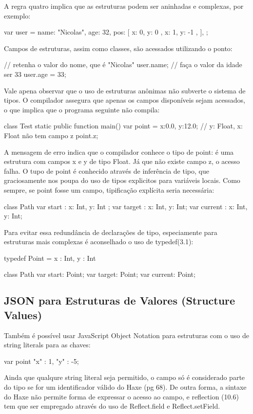 {{{A regra quatro implica que as estruturas podem ser aninhadas  e complexas, por exemplo:

var user = {
   name: "Nicolas",
   age: 32,
   pos: [
    { x: 0, y: 0 },
    { x: 1, y: -1 },
 ],
};

Campos de estruturas, assim como classes, são acessados utilizando o ponto:

// retenha o valor do nome, que é "Nicolas"
user.name;
// faça o valor da idade ser 33
user.age = 33;

Vale apena observar que o uso de estruturas anônimas não subverte o sistema de tipos. O compilador assegura que apenas os campos disponíveis sejam acessados, o que implica que o programa seguinte não compila:

class Test {
   static public function main() {
     var point = { x:0.0, y:12.0};
     // { y: Float, x: Float} não tem campo z
     point.z;
   }   
}

A mensagem de erro indica que o compilador conhece o tipo de point: é uma estrutura com campos x e y de tipo Float. Já que não existe campo z, o acesso falha. O tupo de point é conhecido através de inferência de tipo, que graciosamente nos poupa do uso de tipos explicitos para variáveis locais. Como sempre, se point fosse um campo, tipificação explícita seria necessária:

class Path {
   var start : {x: Int, y: Int };
   var target : {x: Int, y: Int};
   var current : { x: Int, y: Int};
}

Para evitar essa redundância de declarações de tipo, especiamente para estruturas mais complexas é aconselhado o uso de typedef(3.1):

typedef Point = { x : Int, y : Int }

class Path {
    var start: Point;
    var target: Point;
    var current: Point;
}

\subsection {JSON para Estruturas de Valores (Structure Values)}

Também é possível usar JavaScript Object Notation para estruturas com o uso de string literals para as chaves:

var point {"x" : 1, "y" : -5};

Ainda que qualqure string literal seja permitido, o campo só é considerado parte do tipo se for um identificador válido do Haxe (pg 68). De outra forma, a sintaxe do Haxe não permite  forma de expressar o acesso ao campo, e reflection (10.6) tem que ser empregado através do uso de Reflect.field e Reflect.setField.

}}}
